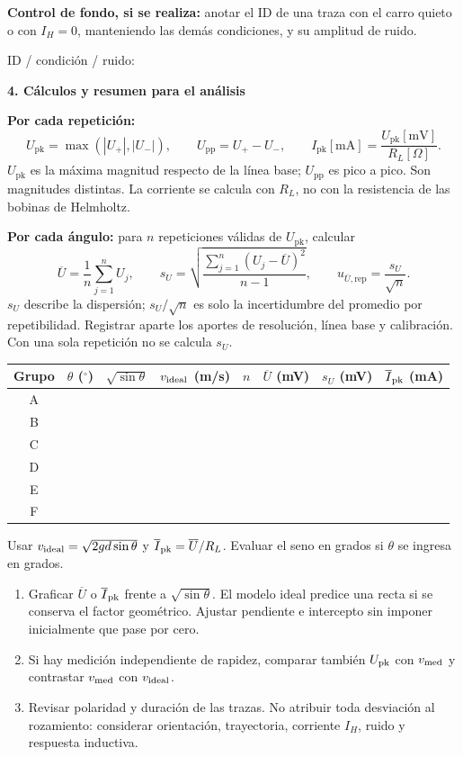 \documentclass[11pt,letterpaper]{article}
\newcommand{\titulo}[1]{{\Large\bfseries #1}\par\vspace{4pt}}
\newcommand{\subtitulo}[1]{\vspace{5pt}{\bfseries #1}\par}
\begin{document}
\textbf{Control de fondo, si se realiza:} anotar el ID de una traza con el carro quieto o con $I_H=0$, manteniendo las demás condiciones, y su amplitud de ruido.

ID / condición / ruido: \hrulefill

\newpage
\normalsize
\titulo{4. Cálculos y resumen para el análisis}
\textbf{Por cada repetición:}
\[
 U_{\mathrm{pk}}=\max(|U_+|,|U_-|),\qquad
 U_{\mathrm{pp}}=U_+-U_-,\qquad
 I_{\mathrm{pk}}[\mathrm{mA}]=\frac{U_{\mathrm{pk}}[\mathrm{mV}]}{R_L[\Omega]}.
\]
$U_{\mathrm{pk}}$ es la máxima magnitud respecto de la línea base; $U_{\mathrm{pp}}$ es pico a pico. Son magnitudes distintas. La corriente se calcula con $R_L$, no con la resistencia de las bobinas de Helmholtz.

\textbf{Por cada ángulo:} para $n$ repeticiones válidas de $U_{\mathrm{pk}}$, calcular
\[
 \overline U=\frac{1}{n}\sum_{j=1}^n U_j,\qquad
 s_U=\sqrt{\frac{\sum_{j=1}^n(U_j-\overline U)^2}{n-1}},\qquad
 u_{\overline U,\mathrm{rep}}=\frac{s_U}{\sqrt n}.
\]
$s_U$ describe la dispersión; $s_U/\sqrt n$ es solo la incertidumbre del promedio por repetibilidad. Registrar aparte los aportes de resolución, línea base y calibración. Con una sola repetición no se calcula $s_U$.

\small
\renewcommand{\arraystretch}{1.15}
\begin{tabularx}{\linewidth}{|c|Y|Y|Y|Y|Y|Y|Y|}\hline
Grupo & $\theta$ ($^\circ$) & $\sqrt{\sin\theta}$ & $v_{\rm ideal}$ (m/s) & $n$ & $\overline U$ (mV) & $s_U$ (mV) & $\overline I_{\rm pk}$ (mA) \\\hline
A & & & & & & & \\[0.8cm]\hline
B & & & & & & & \\[0.8cm]\hline
C & & & & & & & \\[0.8cm]\hline
D & & & & & & & \\[0.8cm]\hline
E & & & & & & & \\[0.8cm]\hline
F & & & & & & & \\[0.8cm]\hline
\end{tabularx}
\normalsize

Usar $v_{\rm ideal}=\sqrt{2gd\sin\theta}$ y $\overline I_{\rm pk}=\overline U/R_L$. Evaluar el seno en grados si $\theta$ se ingresa en grados.

\subtitulo{Gráficos e interpretación}
\begin{enumerate}
\item Graficar $\overline U$ o $\overline I_{\rm pk}$ frente a $\sqrt{\sin\theta}$. El modelo ideal predice una recta si se conserva el factor geométrico. Ajustar pendiente e intercepto sin imponer inicialmente que pase por cero.
\item Si hay medición independiente de rapidez, comparar también $U_{\rm pk}$ con $v_{\rm med}$ y contrastar $v_{\rm med}$ con $v_{\rm ideal}$.
\item Revisar polaridad y duración de las trazas. No atribuir toda desviación al rozamiento: considerar orientación, trayectoria, corriente $I_H$, ruido y respuesta inductiva.
\end{enumerate}
\end{document}
